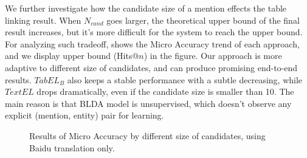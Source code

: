 We further investigate how the candidate size of a mention effects the table linking result.
When $N_{cand}$ goes larger, the theoretical upper bound of the final result increases,
but it's more difficult for the system to reach the upper bound.
For analyzing such tradeoff,
 shows the Micro Accuracy trend of each approach,
and we display upper bound (Hits@$n$) in the figure.
Our approach is more adaptive to different size of candidates,
and can produce promising end-to-end results.
$TabEL_B$ also keeps a stable performance with a subtle decreasing, 
while $TextEL$ drops dramatically, even if the candidate size is smaller than 10.
The main reason is that BLDA model is unsupervised, which doesn't observe any explicit
(mention, entity) pair for learning.



\begin{figure}[th]
\centering
\caption{Results of Micro Accuracy by different size of candidates,
using Baidu translation only.}
\label{fig:main-result}
\end{figure}


